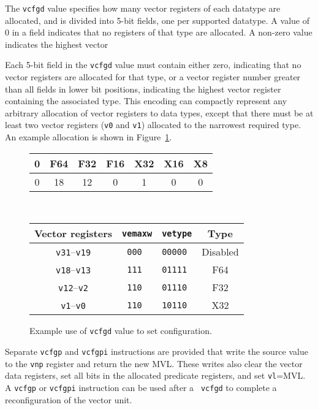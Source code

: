 The {\tt vcfgd} value specifies how many vector registers of each
datatype are allocated, and is divided into 5-bit fields, one per
supported datatype.  A value of 0 in a field indicates that no
registers of that type are allocated.  A non-zero value indicates the
highest vector

Each 5-bit field in the {\tt vcfgd} value must contain either zero,
indicating that no vector registers are allocated for that type, or a
vector register number greater than all fields in lower bit positions,
indicating the highest vector register containing the associated type.
This encoding can compactly represent any arbitrary allocation of
vector registers to data types, except that there must be at least two
vector registers ({\tt v0} and {\tt v1}) allocated to the narrowest
required type. An example allocation is shown in
Figure~\ref{fig:vcfgdexample}.

\begin{figure}
  \centering
  \begin{tabular}{|c|c|c|c|c|c|c|}
    \hline
     0 & F64 & F32 & F16 & X32 & X16 & X8 \\
     \hline
     \hline
     0 & 18  & 12  & 0   &  1  &  0  & 0  \\
    \hline
  \end{tabular}
  \\
  \vspace{0.1in}
  \begin{tabular}{|c|c|c|c|}
    \hline
    Vector registers & {\tt vemaxw} & {\tt vetype} & Type \\
    \hline
    {\tt v31}--{\tt v19} & \tt 000     & \tt 00000 & Disabled \\
    {\tt v18}--{\tt v13} & \tt 111     & \tt 01111 & F64 \\
    {\tt v12}--{\tt v2}  & \tt 110     & \tt 01110 & F32 \\
    {\tt v1}--{\tt v0}   & \tt 110     & \tt 10110 & X32 \\
    \hline
  \end{tabular}
  \caption{Example use of {\tt vcfgd} value to set configuration.}
  \label{fig:vcfgdexample}
\end{figure}

Separate {\tt vcfgp} and {\tt vcfgpi} instructions are provided that
write the source value to the {\tt vnp} register and return the
new MVL.  These writes also clear the vector data registers, set all
bits in the allocated predicate registers, and set {\tt vl}=MVL. A
{\tt vcfgp} or {\tt vcfgpi} instruction can be used after a {\tt
  vcfgd} to complete a reconfiguration of the vector unit.

